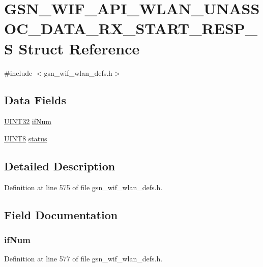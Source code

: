 \hypertarget{a00311}{
\section{GSN\_\-WIF\_\-API\_\-WLAN\_\-UNASSOC\_\-DATA\_\-RX\_\-START\_\-RESP\_\-S Struct Reference}
\label{a00311}
}


{\ttfamily \#include $<$gsn\_\-wif\_\-wlan\_\-defs.h$>$}

\subsection*{Data Fields}
\begin{DoxyCompactItemize}
\item 
\hyperlink{a00660_gae1e6edbbc26d6fbc71a90190d0266018}{UINT32} \hyperlink{a00311_ab582fd779b13f74e06e2491389a60aa0}{ifNum}
\item 
\hyperlink{a00660_gab27e9918b538ce9d8ca692479b375b6a}{UINT8} \hyperlink{a00311_ac4f6d5d1544a8d2c1309479ffe1b61ab}{status}
\end{DoxyCompactItemize}


\subsection{Detailed Description}


Definition at line 575 of file gsn\_\-wif\_\-wlan\_\-defs.h.



\subsection{Field Documentation}
\hypertarget{a00311_ab582fd779b13f74e06e2491389a60aa0}{
\subsubsection[{ifNum}]{ {\bf ifNum}}}
\label{a00311_ab582fd779b13f74e06e2491389a60aa0}


Definition at line 577 of file gsn\_\-wif\_\-wlan\_\-defs.h.

